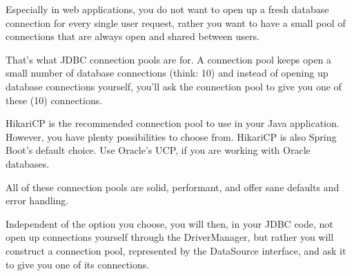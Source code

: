 Especially in web applications, you do not want to open up a fresh database connection for every single user request, rather you want to have a small pool of connections that are always open and shared between users.

That’s what JDBC connection pools are for.  A connection pool keeps open a small number of database connections (think: 10) and instead of opening up database connections yourself, you’ll ask the connection pool to give you one of these (10) connections.



HikariCP is the recommended connection pool to use in your Java application. However, you have plenty possibilities to choose from.
HikariCP is also Spring Boot’s default choice. Use Oracle’s UCP, if you are working with Oracle databases.

All of these connection pools are  solid, performant, and offer sane defaults and error handling.

Independent of the option you choose, you will then, in your JDBC code, not open up connections yourself through the DriverManager, but rather you will construct a connection pool, represented by the DataSource interface, and ask it to give you one of its connections.



